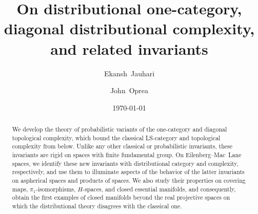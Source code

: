 \documentclass[amscd,amssymb,verbatim,11pt]{amsart}
\date{\today}
\theoremstyle{plain}
\theoremstyle{definition}
\begin{document}
\begin{abstract} 
We develop the theory of probabilistic variants of the one-category and diagonal topological complexity, which bound the classical LS-category and topological complexity from below. Unlike any other classical or probabilistic invariants, these invariants are rigid on spaces with finite fundamental group. On Eilenberg--Mac~Lane spaces, we identify these new invariants with distributional category and complexity, respectively, and use them to illuminate aspects of the behavior of the latter invariants on aspherical spaces and products of spaces. We also study their properties on covering maps, $\pi_1$-isomorphisms, $H$-spaces, and closed essential manifolds, and consequently, obtain the first examples of closed manifolds beyond the real projective spaces on which the distributional theory disagrees with the classical one. 
\end{abstract}





\title[Distributional 1-Category and diagonal distributional complexity]{On distributional one-category, 
\\
diagonal distributional complexity, 
\\
and related invariants}

\author[E.~Jauhari]{Ekansh~Jauhari}

\author[J.~Oprea]{John~Oprea}

\address{Ekansh Jauhari, Department of Mathematics, University of Florida, 358 Little Hall, Gainesville, FL 32611, USA.}


\address{John Oprea, Department of Mathematics, Cleveland State University, Cleveland, OH 44115, USA.}



\end{document}
